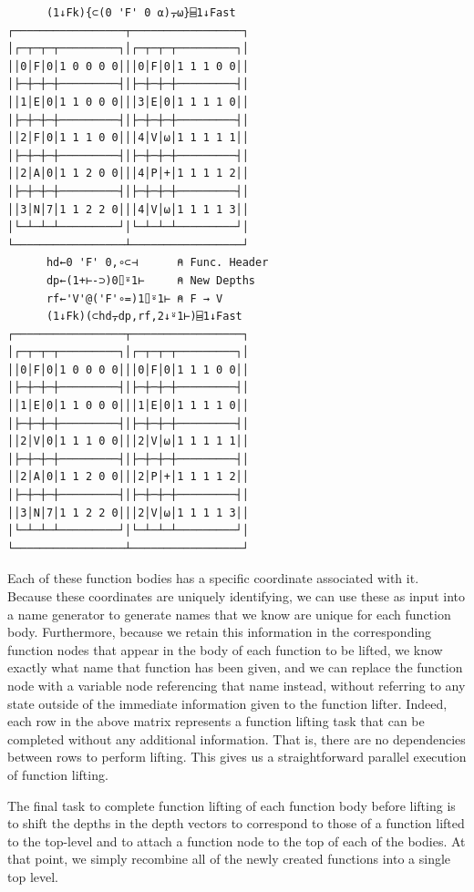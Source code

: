﻿\documentclass[numbers,10pt,preprint]{sigplanconf}
\begin{document}
\begin{verbatim}
      (1↓Fk){⊂(0 'F' 0 ⍺)⍪⍵}⌸1↓Fast
┌─────────────────┬─────────────────┐
│┌─┬─┬─┬─────────┐│┌─┬─┬─┬─────────┐│
││0│F│0│1 0 0 0 0│││0│F│0│1 1 1 0 0││
│├─┼─┼─┼─────────┤│├─┼─┼─┼─────────┤│
││1│E│0│1 1 0 0 0│││3│E│0│1 1 1 1 0││
│├─┼─┼─┼─────────┤│├─┼─┼─┼─────────┤│
││2│F│0│1 1 1 0 0│││4│V│⍵│1 1 1 1 1││
│├─┼─┼─┼─────────┤│├─┼─┼─┼─────────┤│
││2│A│0│1 1 2 0 0│││4│P│+│1 1 1 1 2││
│├─┼─┼─┼─────────┤│├─┼─┼─┼─────────┤│
││3│N│7│1 1 2 2 0│││4│V│⍵│1 1 1 1 3││
│└─┴─┴─┴─────────┘│└─┴─┴─┴─────────┘│
└─────────────────┴─────────────────┘ 
      hd←0 'F' 0,∘⊂⊣      ⍝ Func. Header
      dp←(1+⊢-⊃)0⌷⍤1⊢     ⍝ New Depths
      rf←'V'@('F'∘=)1⌷⍤1⊢ ⍝ F → V
      (1↓Fk)(⊂hd⍪dp,rf,2↓⍤1⊢)⌸1↓Fast
┌─────────────────┬─────────────────┐
│┌─┬─┬─┬─────────┐│┌─┬─┬─┬─────────┐│
││0│F│0│1 0 0 0 0│││0│F│0│1 1 1 0 0││
│├─┼─┼─┼─────────┤│├─┼─┼─┼─────────┤│
││1│E│0│1 1 0 0 0│││1│E│0│1 1 1 1 0││
│├─┼─┼─┼─────────┤│├─┼─┼─┼─────────┤│
││2│V│0│1 1 1 0 0│││2│V│⍵│1 1 1 1 1││
│├─┼─┼─┼─────────┤│├─┼─┼─┼─────────┤│
││2│A│0│1 1 2 0 0│││2│P│+│1 1 1 1 2││
│├─┼─┼─┼─────────┤│├─┼─┼─┼─────────┤│
││3│N│7│1 1 2 2 0│││2│V│⍵│1 1 1 1 3││
│└─┴─┴─┴─────────┘│└─┴─┴─┴─────────┘│
└─────────────────┴─────────────────┘
\end{verbatim}

Each of these function bodies has a specific coordinate associated with it. Because these coordinates are uniquely identifying, we can use these as input into a name generator to generate names that we know are unique for each function body. Furthermore, because we retain this information in the corresponding function nodes that appear in the body of each function to be lifted, we know exactly what name that function has been given, and we can replace the function node with a variable node referencing that name instead, without referring to any state outside of the immediate information given to the function lifter. Indeed, each row in the above matrix represents a function lifting task that can be completed without any additional information. That is, there are no dependencies between rows to perform lifting. This gives us a straightforward parallel execution of function lifting.

The final task to complete function lifting of each function body before lifting is to shift the depths in the depth vectors to correspond to those of a function lifted to the top-level and to attach a function node to the top of each of the bodies. At that point, we simply recombine all of the newly created functions into a single top level.
\end{document}
